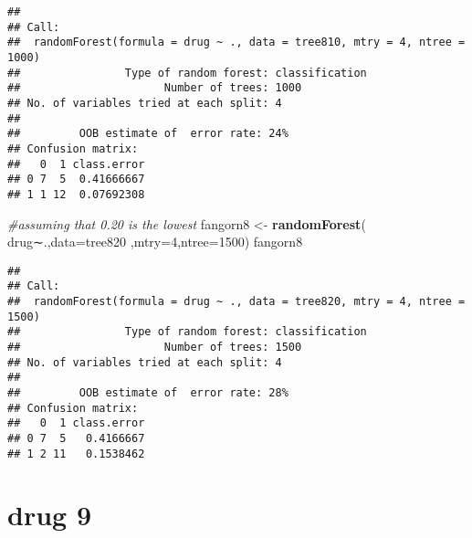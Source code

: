 \documentclass[]{article}
\newenvironment{Shaded}{\begin{snugshade}}{\end{snugshade}}
\newcommand{\KeywordTok}[1]{\textcolor[rgb]{0.13,0.29,0.53}{\textbf{#1}}}
\newcommand{\DataTypeTok}[1]{\textcolor[rgb]{0.13,0.29,0.53}{#1}}
\newcommand{\DecValTok}[1]{\textcolor[rgb]{0.00,0.00,0.81}{#1}}
\newcommand{\StringTok}[1]{\textcolor[rgb]{0.31,0.60,0.02}{#1}}
\newcommand{\CommentTok}[1]{\textcolor[rgb]{0.56,0.35,0.01}{\textit{#1}}}
\newcommand{\OperatorTok}[1]{\textcolor[rgb]{0.81,0.36,0.00}{\textbf{#1}}}
\newcommand{\NormalTok}[1]{#1}
\begin{document}
\begin{verbatim}
## 
## Call:
##  randomForest(formula = drug ~ ., data = tree810, mtry = 4, ntree = 1000) 
##                Type of random forest: classification
##                      Number of trees: 1000
## No. of variables tried at each split: 4
## 
##         OOB estimate of  error rate: 24%
## Confusion matrix:
##   0  1 class.error
## 0 7  5  0.41666667
## 1 1 12  0.07692308
\end{verbatim}

\begin{Shaded}
\begin{Highlighting}[]
\CommentTok{#assuming that 0.20 is the lowest }
\NormalTok{fangorn8 <-}\StringTok{ }\KeywordTok{randomForest}\NormalTok{( drug∼.,}\DataTypeTok{data=}\NormalTok{tree820  ,}\DataTypeTok{mtry=}\DecValTok{4}\NormalTok{,}\DataTypeTok{ntree=}\DecValTok{1500}\NormalTok{)}
\NormalTok{fangorn8}
\end{Highlighting}
\end{Shaded}

\begin{verbatim}
## 
## Call:
##  randomForest(formula = drug ~ ., data = tree820, mtry = 4, ntree = 1500) 
##                Type of random forest: classification
##                      Number of trees: 1500
## No. of variables tried at each split: 4
## 
##         OOB estimate of  error rate: 28%
## Confusion matrix:
##   0  1 class.error
## 0 7  5   0.4166667
## 1 2 11   0.1538462
\end{verbatim}

\section{drug 9}\label{drug-9}

\begin{Shaded}
\end{Shaded}
\end{document}
